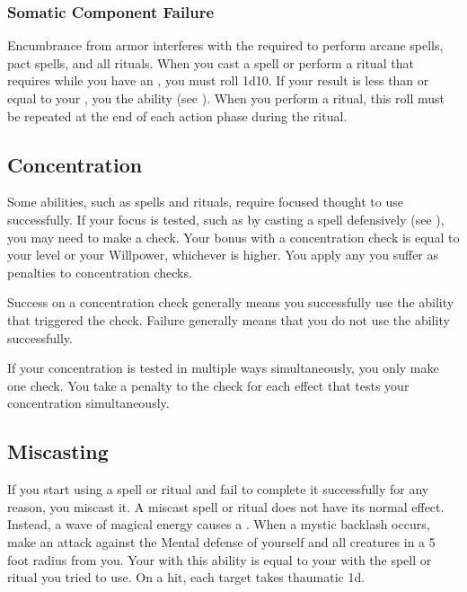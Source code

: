         \subsubsection{Somatic Component Failure}\label{Somatic Component Failure}
            Encumbrance from armor interferes with the  required to perform arcane spells, pact spells, and all rituals.
            When you cast a spell or perform a ritual that requires  while you have an , you must roll 1d10.
            If your result is less than or equal to your , you  the ability (see ).
            When you perform a ritual, this roll must be repeated at the end of each action phase during the ritual.

    \subsection{Concentration}\label{Concentration}
        Some abilities, such as spells and rituals, require focused thought to use successfully.
        If your focus is tested, such as by casting a spell defensively (see ), you may need to make a  check.
        Your bonus with a concentration check is equal to your level or your Willpower, whichever is higher.
        You apply any  you suffer as penalties to concentration checks.

        Success on a concentration check generally means you successfully use the ability that triggered the check.
        Failure generally means that you do not use the ability successfully.

        If your concentration is tested in multiple ways simultaneously, you only make one  check.
        You take a  penalty to the check for each effect that tests your concentration simultaneously.

    \subsection{Miscasting}\label{Miscasting}

        If you start using a spell or ritual and fail to complete it successfully for any reason, you miscast it.
        A miscast spell or ritual does not have its normal effect.
        Instead, a wave of magical energy causes a .
        When a mystic backlash occurs, make an attack against the Mental defense of yourself and all creatures in a 5 foot radius from you.
        Your  with this ability is equal to your  with the spell or ritual you tried to use.
        On a hit, each target takes thaumatic  \minus1d.

